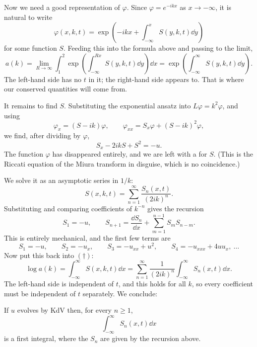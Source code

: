 \documentclass[a4paper]{scrartcl}
\begin{document}
Now we need a good representation of $\varphi$. Since $\varphi = e^{-ikx}$ as $x\to-\infty$, it is natural to write
$$
\varphi(x,k,t) = \exp\left(-ikx + \int_{-\infty}^xS(y,k,t)\dd y\right)
$$
for some function $S$. Feeding this into the formula above and passing to the limit,
\begin{equation*}
a(k) = \lim_{R\to\infty}\int_1^2\exp\left(\int_{-\infty}^{Rx}S(y,k,t)\dd y\right)\dd x = \exp\left(\int_{-\infty}^\infty S(y,k,t)\dd y\right).\tag{$\dagger$}
\end{equation*}
The left-hand side has no $t$ in it; the right-hand side appears to. That is where our conserved quantities will come from.

It remains to find $S$. Substituting the exponential ansatz into $L\varphi = k^2\varphi$, and using
$$
\varphi_x = (S-ik)\varphi, \qquad \varphi_{xx} = S_x\varphi + (S-ik)^2\varphi,
$$
we find, after dividing by $\varphi$,
$$
S_x - 2ikS + S^2 = -u.
$$
The function $\varphi$ has disappeared entirely, and we are left with a  for $S$. (This is the Riccati equation of the Miura transform in disguise, which is no coincidence.)

We solve it as an asymptotic series in $1/k$:
$$
S(x,k,t) = \sum_{n=1}^\infty\frac{S_n(x,t)}{(2ik)^n}.
$$
Substituting and comparing coefficients of $k^{-n}$ gives the recursion
$$
S_1 = -u, \qquad S_{n+1} = \frac{\dd S_n}{\dd x} + \sum_{m=1}^{n-1}S_mS_{n-m}.
$$
This is entirely mechanical, and the first few terms are
$$
S_1 = -u, \qquad S_2 = -u_x, \qquad S_3 = -u_{xx} + u^2, \qquad S_4 = -u_{xxx} + 4uu_x, \ \dots
$$
Now put this back into $(\dagger)$:
$$
\log a(k) = \int_{-\infty}^\infty S(x,k,t)\dd x = \sum_{n=1}^\infty\frac{1}{(2ik)^n}\int_{-\infty}^\infty S_n(x,t)\dd x.
$$
The left-hand side is independent of $t$, and this holds for all $k$, so every coefficient must be independent of $t$ separately. We conclude:

\begin{theorem}
	If $u$ evolves by KdV then, for every $n\ge1$,
	$$
	\int_{-\infty}^\infty S_n(x,t)\dd x
	$$
	is a first integral, where the $S_n$ are given by the recursion above.
\end{theorem}
\end{document}
